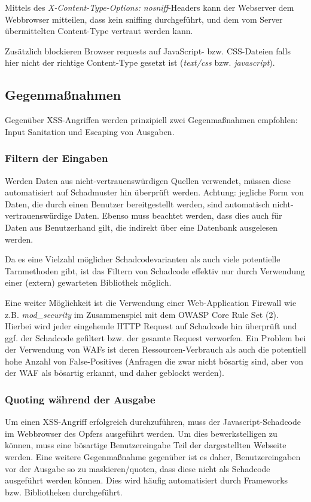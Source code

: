 Mittels des \textit{X-Content-Type-Options: nosniff}-Headers kann der Webserver dem Webbrowser mitteilen, dass kein sniffing durchgeführt, und dem vom Server übermittelten Content-Type vertraut werden kann.

Zusätzlich blockieren Browser requests auf JavaScript- bzw. CSS-Dateien falls hier nicht der richtige Content-Type gesetzt ist (\textit{text/css} bzw. \textit{javascript}).


\subsection{Gegenmaßnahmen}

Gegenüber XSS-Angriffen werden prinzipiell zwei Gegenmaßnahmen empfohlen: Input Sanitation und Escaping von Ausgaben.

\subsubsection{Filtern der Eingaben}

Werden Daten aus nicht-vertrauenswürdigen Quellen verwendet, müssen diese automatisiert auf Schadmuster hin überprüft werden. Achtung: jegliche Form von Daten, die durch einen Benutzer bereitgestellt werden, sind automatisch nicht-vertrauenswürdige Daten. Ebenso muss beachtet werden, dass dies auch für Daten aus Benutzerhand gilt, die indirekt über eine Datenbank ausgelesen werden.

Da es eine Vielzahl möglicher Schadcodevarianten als auch viele potentielle Tarnmethoden gibt, ist das Filtern von Schadcode effektiv nur durch Verwendung einer (extern) gewarteten Bibliothek möglich.

Eine weiter Möglichkeit ist die Verwendung einer Web-Application Firewall wie z.B. \textit{mod\_security} im Zusammenspiel mit dem OWASP Core Rule Set (2). Hierbei wird jeder eingehende HTTP Request auf Schadcode hin überprüft und ggf. der Schadcode gefiltert bzw. der gesamte Request verworfen. Ein Problem bei der Verwendung von WAFs ist deren Ressourcen-Verbrauch als auch die potentiell hohe Anzahl von False-Positives (Anfragen die zwar nicht bösartig sind, aber von der WAF als bösartig erkannt, und daher geblockt werden).

\subsubsection{Quoting während der Ausgabe}

Um einen XSS-Angriff erfolgreich durchzuführen, muss der Javascript-Schadcode im Webbrowser des Opfers ausgeführt werden. Um dies bewerkstelligen zu können, muss eine bösartige Benutzereingabe Teil der dargestellten Webseite werden. Eine weitere Gegenmaßnahme gegenüber ist es daher, Benutzereingaben vor der Ausgabe so zu maskieren/quoten, dass diese nicht als Schadcode ausgeführt werden können. Dies wird häufig automatisiert durch Frameworks bzw. Bibliotheken durchgeführt.

